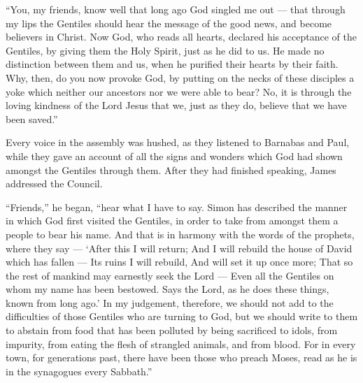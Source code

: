 ``You, my friends, know well that long ago God singled me out --- that
through my lips the Gentiles should hear the message of the good news,
and become believers in Christ.  Now God, who reads all
hearts, declared his acceptance of the Gentiles, by giving them the Holy
Spirit, just as he did to us.  He made no distinction
between them and us, when he purified their hearts by their faith.
 Why, then, do you now provoke God, by putting on the necks
of these disciples a yoke which neither our ancestors nor we were able
to bear?  No, it is through the loving kindness of the Lord
Jesus that we, just as they do, believe that we have been saved.''

 Every voice in the assembly was hushed, as they listened
to Barnabas and Paul, while they gave an account of all the signs and
wonders which God had shown amongst the Gentiles through them.
 After they had finished speaking, James addressed the
Council.

``Friends,'' he began, ``hear what I have to say.  Simon
has described the manner in which God first visited the Gentiles, in
order to take from amongst them a people to bear his name. 
And that is in harmony with the words of the prophets, where they say
---  `After this I will return; And I will rebuild the
house of David which has fallen --- Its ruins I will rebuild, And will
set it up once more;  That so the rest of mankind may
earnestly seek the Lord --- Even all the Gentiles on whom my name has
been bestowed.  Says the Lord, as he does these things,
known from long ago.'  In my judgement, therefore, we
should not add to the difficulties of those Gentiles who are turning to
God,  but we should write to them to abstain from food that
has been polluted by being sacrificed to idols, from impurity, from
eating the flesh of strangled animals, and from blood.  For
in every town, for generations past, there have been those who preach
Moses, read as he is in the synagogues every Sabbath.''

